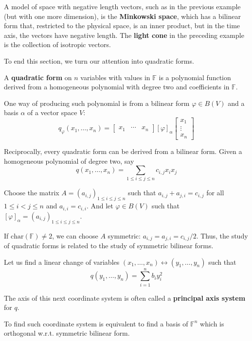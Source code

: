 A model of space with negative length vectors, such as in the previous example (but with one more dimension), is the \textbf{Minkowski space}, which has a bilinear form that, restricted to the physical space, is an inner product, but in the time axis, the vectors have negative length.  The \textbf{light cone} in the preceding example is the collection of isotropic vectors.

To end this section, we turn our attention into quadratic forms. 

\begin{definition}
  A \textbf{quadratic form} on $n$ variables with values in $\mathbb{F}$ is a polynomial function derived from a homogeneous polynomial with degree two and coefficients in $\mathbb{F}$. 
\end{definition}

One way of producing such polynomial is from a bilinear form $\varphi \in B(V)$ and a basis $\alpha$ of a vector space $V$: 
\[
  q_\varphi (x_1, \ldots, x_n) = \begin{bmatrix}
    x_1 & \cdots & x_n 
  \end{bmatrix}
  [\varphi]_\alpha 
  \begin{bmatrix}
    x_1 \\
    \vdots \\
    x_n 
  \end{bmatrix}
\]

Reciprocally, every quadratic form can be derived from a bilinear form. Given a homogeneous polynomial of degree two, say 
\[
  q(x_1, \ldots, x_n) = \sum_{1 \leq i \leq j \leq n} c_{i,j} x_i x_j
\]

Choose the matrix $A = (a_{i,j})_{1 \leq i \leq j \leq n}$ such that $a_{i,j} + a_{j,i} = c_{i,j}$ for all $1 \leq i < j \leq n$ and $a_{i,i} = c_{i,i}$. And let $\varphi \in B(V)$ such that $[\varphi]_\alpha = (a_{i,j})_{1 \leq i \leq j \leq n}$. 

If $\text{char}(\mathbb{F}) \neq 2$, we can choose $A$ symmetric: $a_{i,j} = a_{j,i} = c_{i,j}/2$. Thus, the study of quadratic forms is related to the study of symmetric bilinear forms. 

Let us find a linear change of variables $(x_1, \ldots, x_n) \leftrightarrow (y_1, \ldots, y_n)$ such that 
\[
  q(y_1, \ldots, y_n) = \sum_{i=1}^n b_i y_i^2
\]

The axis of this next coordinate system is often called a \textbf{principal axis system} for $q$. 

To find such coordinate system is equivalent to find a basis of $\mathbb{F}^n$ which is orthogonal w.r.t. symmetric bilinear form. 

